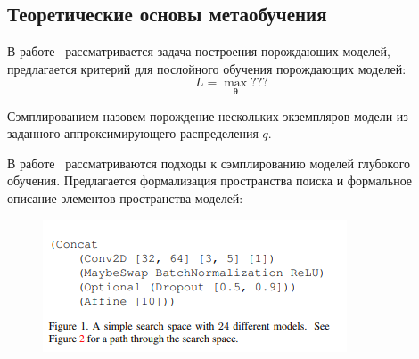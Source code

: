\subsection*{Теоретические основы метаобучения }
В работе~\cite{layerwise_optimal} рассматривается задача построения порождающих моделей, предлагается критерий для послойного обучения порождающих моделей:
$$
L = \max_{\boldsymbol{\theta}} ???
$$

\begin{defin}
Сэмплированием назовем порождение нескольких экземпляров модели из заданного аппроксимирующего распределения $q$.
\end{defin}

В работе~\cite{search_space} рассматриваются подходы к сэмплированию моделей глубокого обучения. Предлагается формализация пространства поиска и формальное описание элементов  пространства моделей:
 \begin{figure}[H]
\includegraphics[width=\textwidth]{./plots/arch_review_figs/search_space.png}
\end{figure}

